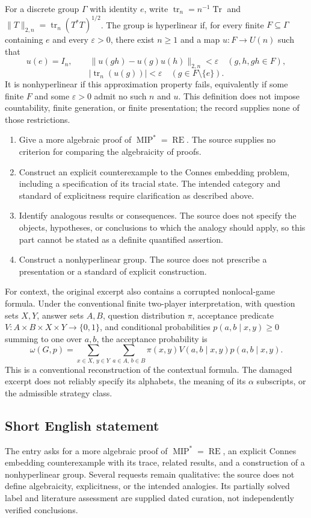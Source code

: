 \documentclass[11pt]{article}
\begin{document}
For a discrete group \(\Gamma\) with identity \(e\), write \(\operatorname{tr}_n=n^{-1}\operatorname{Tr}\) and \(\|T\|_{2,n}=\operatorname{tr}_n(T^*T)^{1/2}\). The group is hyperlinear if, for every finite \(F\subseteq\Gamma\) containing \(e\) and every \(\varepsilon>0\), there exist \(n\geq1\) and a map \(u:F\to U(n)\) such that
\[
 u(e)=I_n,\qquad
 \|u(gh)-u(g)u(h)\|_{2,n}<\varepsilon
 \quad(g,h,gh\in F),
\]
\[
 |\operatorname{tr}_n(u(g))|<\varepsilon
 \quad(g\in F\setminus\{e\}).
\]
It is nonhyperlinear if this approximation property fails, equivalently if some finite \(F\) and some \(\varepsilon>0\) admit no such \(n\) and \(u\). This definition does not impose countability, finite generation, or finite presentation; the record supplies none of those restrictions.

\begin{enumerate}
\item Give a more algebraic proof of \(\operatorname{MIP}^{*}=\operatorname{RE}\). The source supplies no criterion for comparing the algebraicity of proofs.
\item Construct an explicit counterexample to the Connes embedding problem, including a specification of its tracial state. The intended category and standard of explicitness require clarification as described above.
\item Identify analogous results or consequences. The source does not specify the objects, hypotheses, or conclusions to which the analogy should apply, so this part cannot be stated as a definite quantified assertion.
\item Construct a nonhyperlinear group. The source does not prescribe a presentation or a standard of explicit construction.
\end{enumerate}

For context, the original excerpt also contains a corrupted nonlocal-game formula. Under the conventional finite two-player interpretation, with question sets \(X,Y\), answer sets \(A,B\), question distribution \(\pi\), acceptance predicate \(V:A\times B\times X\times Y\to\{0,1\}\), and conditional probabilities \(p(a,b\mid x,y)\geq0\) summing to one over \(a,b\), the acceptance probability is
\[
 \omega(G,p)=\sum_{x\in X,\,y\in Y}\sum_{a\in A,\,b\in B}
 \pi(x,y)V(a,b\mid x,y)p(a,b\mid x,y).
\]
This is a conventional reconstruction of the contextual formula. The damaged excerpt does not reliably specify its alphabets, the meaning of its \(\alpha\) subscripts, or the admissible strategy class.
\subsection{Short English statement}
The entry asks for a more algebraic proof of \(\operatorname{MIP}^{*}=\operatorname{RE}\), an explicit Connes embedding counterexample with its trace, related results, and a construction of a nonhyperlinear group. Several requests remain qualitative: the source does not define algebraicity, explicitness, or the intended analogies. Its partially solved label and literature assessment are supplied dated curation, not independently verified conclusions.
\end{document}

